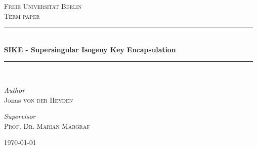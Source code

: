\documentclass[12pt]{article}
\begin{document}
\makeatletter
\makeatother
\begin{titlepage}  
\center 
\textsc{\LARGE Freie Universität Berlin}\\[1.5cm]
\textsc{\Large Term paper}\\[0.5cm]
\rule{\linewidth}{0.5mm}\\[0.4cm]
{\large\bfseries{} SIKE - Supersingular Isogeny Key Encapsulation}\\[0.4cm]
\rule{\linewidth}{0.5mm}\\[1.5cm]

\begin{minipage}[t]{0.4\textwidth}
	\begin{flushleft}
		\large
		\textit{Author}\\
		Jonas \textsc{von der Heyden}
	\end{flushleft}
\end{minipage}
\begin{minipage}[t]{0.4\textwidth}
	\begin{flushright}
		\large
                \textit{Supervisor}\\
        \textsc{Prof. Dr. Marian Margraf}\\
	\end{flushright}
\end{minipage}  


\vfill\vfill\vfill
{\large\today}

\end{titlepage}

\setcounter{page}{1}
\tableofcontents{}

\newpage

\setcounter{page}{1}


\clearpage


\clearpage


\clearpage


\clearpage


\clearpage


\clearpage

\setcounter{page}{1}
\clearpage

\clearpage

\clearpage
\printbibliography
\end{document}
